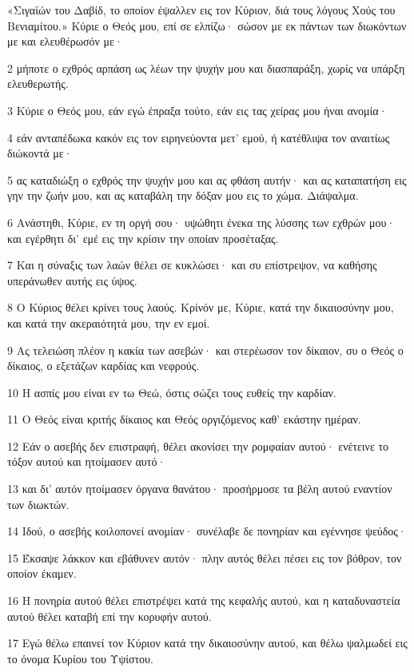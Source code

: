\par «Σιγαϊών του Δαβίδ, το οποίον έψαλλεν εις τον Κύριον, διά τους λόγους Χούς του Βενιαμίτου.» Κύριε ο Θεός μου, επί σε ελπίζω· σώσον με εκ πάντων των διωκόντων με και ελευθέρωσόν με·
\par 2 μήποτε ο εχθρός αρπάση ως λέων την ψυχήν μου και διασπαράξη, χωρίς να υπάρξη ελευθερωτής.
\par 3 Κύριε ο Θεός μου, εάν εγώ έπραξα τούτο, εάν εις τας χείρας μου ήναι ανομία·
\par 4 εάν ανταπέδωκα κακόν εις τον ειρηνεύοντα μετ' εμού, ή κατέθλιψα τον αναιτίως διώκοντά με·
\par 5 ας καταδιώξη ο εχθρός την ψυχήν μου και ας φθάση αυτήν· και ας καταπατήση εις γην την ζωήν μου, και ας καταβάλη την δόξαν μου εις το χώμα. Διάψαλμα.
\par 6 Ανάστηθι, Κύριε, εν τη οργή σου· υψώθητι ένεκα της λύσσης των εχθρών μου· και εγέρθητι δι' εμέ εις την κρίσιν την οποίαν προσέταξας.
\par 7 Και η σύναξις των λαών θέλει σε κυκλώσει· και συ επίστρεψον, να καθήσης υπεράνωθεν αυτής εις ύψος.
\par 8 Ο Κύριος θέλει κρίνει τους λαούς. Κρίνόν με, Κύριε, κατά την δικαιοσύνην μου, και κατά την ακεραιότητά μου, την εν εμοί.
\par 9 Ας τελειώση πλέον η κακία των ασεβών· και στερέωσον τον δίκαιον, συ ο Θεός ο δίκαιος, ο εξετάζων καρδίας και νεφρούς.
\par 10 Η ασπίς μου είναι εν τω Θεώ, όστις σώζει τους ευθείς την καρδίαν.
\par 11 Ο Θεός είναι κριτής δίκαιος και Θεός οργιζόμενος καθ' εκάστην ημέραν.
\par 12 Εάν ο ασεβής δεν επιστραφή, θέλει ακονίσει την ρομφαίαν αυτού· ενέτεινε το τόξον αυτού και ητοίμασεν αυτό·
\par 13 και δι' αυτόν ητοίμασεν όργανα θανάτου· προσήρμοσε τα βέλη αυτού εναντίον των διωκτών.
\par 14 Ιδού, ο ασεβής κοιλοπονεί ανομίαν· συνέλαβε δε πονηρίαν και εγέννησε ψεύδος·
\par 15 Έκσαψε λάκκον και εβάθυνεν αυτόν· πλην αυτός θέλει πέσει εις τον βόθρον, τον οποίον έκαμεν.
\par 16 Η πονηρία αυτού θέλει επιστρέψει κατά της κεφαλής αυτού, και η καταδυναστεία αυτού θέλει καταβή επί την κορυφήν αυτού.
\par 17 Εγώ θέλω επαινεί τον Κύριον κατά την δικαιοσύνην αυτού, και θέλω ψαλμωδεί εις το όνομα Κυρίου του Υψίστου.

